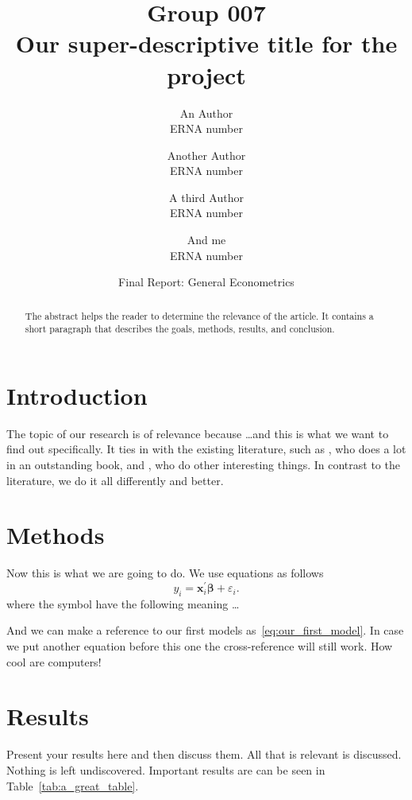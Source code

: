 \documentclass[11pt,a4paper]{article}
\begin{document}
\title{Group 007\\Our super-descriptive title for the project}
\author{An Author\\ERNA number
\and Another Author\\ERNA number
\and A third Author\\ERNA number
\and And me\\ERNA number}
\date{Final Report: General Econometrics}

\maketitle

\begin{abstract}
The abstract helps the reader to determine the relevance of the article. 
It contains a short paragraph that describes the goals, methods, results, 
and conclusion.
\end{abstract}


\section{Introduction}
The topic of our research is of relevance because \ldots and this is what we want to find out specifically. It ties in with the existing literature, such as \cite{amemiya85}, who does a lot in an outstanding book, and \cite{carter97}, who do other interesting things. In contrast to the literature, we do it all differently and better.

\section{Methods}
Now this is what we are going to do. We use equations as follows
\begin{equation}
    y_i =\mathbf{x}_i^\prime\boldsymbol\beta + \varepsilon_i
\label{eq:our_first_model}.
\end{equation}
where the symbol have the following meaning \ldots

And we can make a reference to our first models as~\eqref{eq:our_first_model}. In case we put another equation before this one the cross-reference will still work. How cool are computers!


\section{Results}
Present your results here and then discuss them. All that is relevant is discussed. Nothing is left undiscovered. Important results are can be seen in Table~\ref{tab:a_great_table}. 
\end{document}
